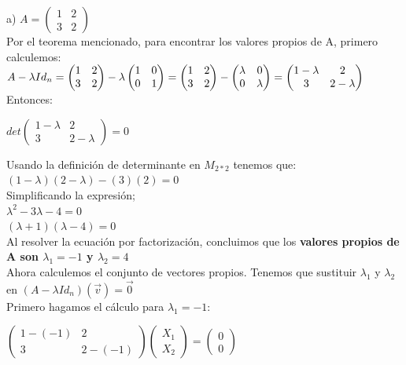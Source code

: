 \documentclass[letterpaper]{article}
\renewcommand{\*}{\cdot}
\theoremstyle{definition}
\begin{document}
	a) $A = \begin{pmatrix} 1 & 2 \\ 3 & 2 \end{pmatrix}$\\
	Por el teorema mencionado, para encontrar los valores propios de A, primero calculemos:\\
	$A- \lambda Id_{n}= \begin{pmatrix} 1 & 2 \\ 3 & 2 \end{pmatrix} - \lambda \begin{pmatrix} 1 & 0 \\ 0 & 1 \end{pmatrix} = \begin{pmatrix} 1 & 2 \\ 3 & 2 \end{pmatrix} - \begin{pmatrix} \lambda & 0 \\ 0 & \lambda \end{pmatrix} = \begin{pmatrix} 1-\lambda & 2 \\ 3 & 2-\lambda \end{pmatrix} \\$
	Entonces:\\
	\begin{center}
	$det \begin{pmatrix} 1-\lambda & 2 \\ 3 & 2-\lambda \end{pmatrix} = 0$
	\end{center}
	Usando la definición de determinante en $M_{2*2}$ tenemos que:\\
	$(1-\lambda)(2-\lambda)-(3)(2)= 0$\\
	Simplificando la expresión;\\
	$\lambda^{2}-3\lambda-4=0$\\
	$(\lambda+1)(\lambda-4)=0$\\
	Al resolver la ecuación por factorización, concluimos que los \textbf{valores propios de A son $\lambda_{1}= -1$ y $\lambda_{2}=4$}\\
	Ahora calculemos el conjunto de vectores propios. Tenemos que sustituir $\lambda_{1}$ y $\lambda_{2}$ en $(A-\lambda Id_{n})(\vec{v})=\vec{0}$\\
	Primero hagamos el cálculo para $\lambda_{1}=-1$:\\
	\begin{center}
	$\begin{pmatrix} 1-(-1) & 2 \\ 3 & 2-(-1) \end{pmatrix} \begin{pmatrix}	X_{1} \\ X_{2} \end{pmatrix}= \begin{pmatrix}	0 \\ 0	\end{pmatrix}$
	\end{center} 
\end{document}
